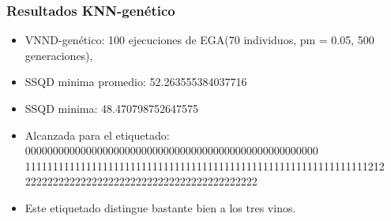 \documentclass[11pt]{beamer}
\begin{document}
        \begin{frame}
        \frametitle{Resultados KNN-genético}
    \begin{itemize}
        \item VNND-genético: 100 ejecuciones  de EGA(70 individuos, pm = 0.05, 500 generaciones), 
        \item SSQD minima promedio: 52.263555384037716
        \item SSQD minima: 48.470798752647575
        \item Alcanzada para el etiquetado:
            {\scriptsize 00000000000000000000000000000000000000000000000000000
        11111111111111111111111111111111111111111111111111111111111111212
        222222222222222222222222222222222222222222}

        \item Este etiquetado distingue bastante bien a los tres vinos. 

%        
    \end{itemize}
\end{frame}
\end{document}
